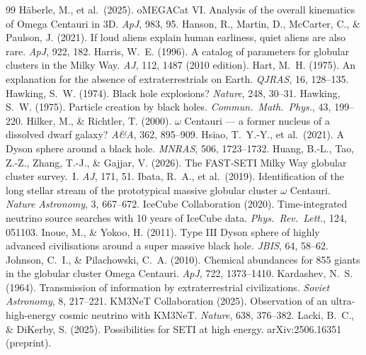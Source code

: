 \documentclass[11pt]{article}
\begin{document}
\begin{thebibliography}{99}
 H\"aberle, M., et al.\ (2025). oMEGACat VI. Analysis of the overall kinematics of Omega Centauri in 3D. \emph{ApJ}, 983, 95.
 Hanson, R., Martin, D., McCarter, C., \& Paulson, J. (2021). If loud aliens explain human earliness, quiet aliens are also rare. \emph{ApJ}, 922, 182.
 Harris, W.~E. (1996). A catalog of parameters for globular clusters in the Milky Way. \emph{AJ}, 112, 1487 (2010 edition).
 Hart, M.~H. (1975). An explanation for the absence of extraterrestrials on Earth. \emph{QJRAS}, 16, 128--135.
 Hawking, S.~W. (1974). Black hole explosions? \emph{Nature}, 248, 30--31.
 Hawking, S.~W. (1975). Particle creation by black holes. \emph{Commun.\ Math.\ Phys.}, 43, 199--220.
 Hilker, M., \& Richtler, T. (2000). $\omega$ Centauri --- a former nucleus of a dissolved dwarf galaxy? \emph{A\&A}, 362, 895--909.
 Hsiao, T.~Y.-Y., et al.\ (2021). A Dyson sphere around a black hole. \emph{MNRAS}, 506, 1723--1732.
 Huang, B.-L., Tao, Z.-Z., Zhang, T.-J., \& Gajjar, V. (2026). The FAST-SETI Milky Way globular cluster survey.\ I. \emph{AJ}, 171, 51.
 Ibata, R.~A., et al.\ (2019). Identification of the long stellar stream of the prototypical massive globular cluster $\omega$ Centauri. \emph{Nature Astronomy}, 3, 667--672.
 IceCube Collaboration (2020). Time-integrated neutrino source searches with 10 years of IceCube data. \emph{Phys.\ Rev.\ Lett.}, 124, 051103.
 Inoue, M., \& Yokoo, H. (2011). Type III Dyson sphere of highly advanced civilisations around a super massive black hole. \emph{JBIS}, 64, 58--62.
 Johnson, C.~I., \& Pilachowski, C.~A. (2010). Chemical abundances for 855 giants in the globular cluster Omega Centauri. \emph{ApJ}, 722, 1373--1410.
 Kardashev, N.~S. (1964). Transmission of information by extraterrestrial civilizations. \emph{Soviet Astronomy}, 8, 217--221.
 KM3NeT Collaboration (2025). Observation of an ultra-high-energy cosmic neutrino with KM3NeT. \emph{Nature}, 638, 376--382.
 Lacki, B.~C., \& DiKerby, S. (2025). Possibilities for SETI at high energy. arXiv:2506.16351 (preprint).

\end{thebibliography}
\end{document}
